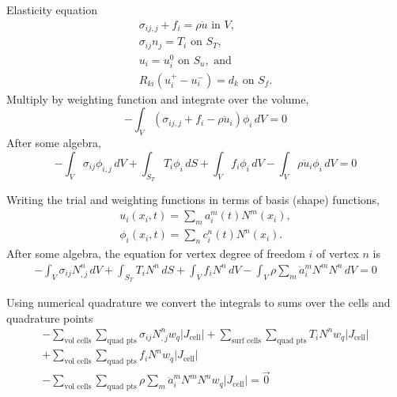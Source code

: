 \documentclass[pdftex,cig,slideColor]{pp4slides}
\begin{document}
  \summary{}

  \vfill
  Elasticity equation
  \begin{gather}
    \sigma_{ij,j} + f_i = \rho \ddot{u} \text{ in } V, \\
    \sigma_{ij} n_j = T_i \text{ on } S_T, \\
    u_i = u_i^0 \text{ on } S_u, \text{ and } \\
    R_{ki}(u^{+}_i - u^{-}_i) = d_k \text{ on } S_f.
  \end{gather}
  Multiply by weighting function and integrate over the volume,
  \begin{equation}
    -\int_V (\sigma_{ij,j} + f_i - \rho \ddot{u}_i) \phi_i \, dV = 0
  \end{equation}
  After some algebra,
  \begin{equation}
    -\int_V \sigma_{ij} \phi_{i,j} \, dV 
    + \int_{S_T} T_i \phi_i\, dS
    + \int_V f_i \phi_i \, dV 
    - \int_V \rho \ddot{u}_i \phi_i \, dV = 0
  \end{equation}
  \vfill
  
  
  
  \summary{}

  \vfill
  Writing the trial and weighting functions in terms of basis (shape)
  functions,
  \begin{gather}
    u_i(x_i, t) = \sum_m a^m_i(t) N^m(x_i), \\
    \phi_i(x_i, t) = \sum_n c^n_i(t) N^n(x_i).
  \end{gather}
  After some algebra, the equation for vertex degree of freedom $i$ of
  vertex $n$ is
  \begin{multline}
    -\int_V \sigma_{ij} N^n_{,j} \, dV 
    + \int_{S_T} T_i N^n \, dS
    + \int_V f_i N^n \, dV 
    - \int_V \rho \sum_m \ddot{a}^m_i N^m N^n \, dV = 0
  \end{multline}
  \vfill

  \summary{}

  Using numerical quadrature we convert the integrals to sums over the
  cells and quadrature points
  \begin{multline}
    -\sum_\text{vol cells} \sum_\text{quad pts} \sigma_{ij} N^n_{,j} w_q |J_\text{cell}|
    + \sum_\text{surf cells} \sum_\text{quad pts} T_i N^n w_q |J_\text{cell}|\\
    + \sum_\text{vol cells} \sum_\text{quad pts}  f_i N^n w_q |J_\text{cell}|\\
    - \sum_\text{vol cells} \sum_\text{quad pts} \rho \sum_m \ddot{a}^m_i N^m N^n w_q |J_\text{cell}| = \vec{0}    
  \end{multline}
\end{document}
